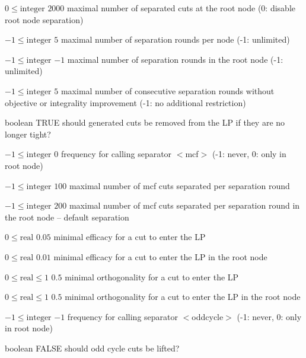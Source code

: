 %
{$0\leq\textrm{integer}$}%
{$2000$}%
{maximal number of separated cuts at the root node (0: disable root node separation)}%
{}

%
{$-1\leq\textrm{integer}$}%
{$5$}%
{maximal number of separation rounds per node (-1: unlimited)}%
{}

%
{$-1\leq\textrm{integer}$}%
{$-1$}%
{maximal number of separation rounds in the root node (-1: unlimited)}%
{}

%
{$-1\leq\textrm{integer}$}%
{$5$}%
{maximal number of consecutive separation rounds without objective or integrality improvement (-1: no additional restriction)}%
{}

%
{boolean}%
{TRUE}%
{should generated cuts be removed from the LP if they are no longer tight?}%
{}

%
{$-1\leq\textrm{integer}$}%
{$0$}%
{frequency for calling separator $<$mcf$>$ (-1: never, 0: only in root node)}%
{}

%
{$-1\leq\textrm{integer}$}%
{$100$}%
{maximal number of mcf cuts separated per separation round}%
{}

%
{$-1\leq\textrm{integer}$}%
{$200$}%
{maximal number of mcf cuts separated per separation round in the root node  -- default separation}%
{}

%
{$0\leq\textrm{real}$}%
{$0.05$}%
{minimal efficacy for a cut to enter the LP}%
{}

%
{$0\leq\textrm{real}$}%
{$0.01$}%
{minimal efficacy for a cut to enter the LP in the root node}%
{}

%
{$0\leq\textrm{real}\leq1$}%
{$0.5$}%
{minimal orthogonality for a cut to enter the LP}%
{}

%
{$0\leq\textrm{real}\leq1$}%
{$0.5$}%
{minimal orthogonality for a cut to enter the LP in the root node}%
{}

%
{$-1\leq\textrm{integer}$}%
{$-1$}%
{frequency for calling separator $<$oddcycle$>$ (-1: never, 0: only in root node)}%
{}

%
{boolean}%
{FALSE}%
{should odd cycle cuts be lifted?}%
{}

